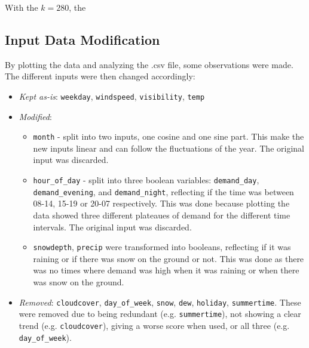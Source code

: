     With the $k = 280$, the

    







    \subsection{Input Data Modification}
    \label{sec:input data modification}
    By plotting the data and analyzing the .csv file, some observations were made. The different inputs were then changed accordingly:
    \begin{itemize}
        \item \emph{Kept as-is}: \texttt{weekday}, \texttt{windspeed}, \texttt{visibility}, \texttt{temp}
        \item \emph{Modified}:
        \begin{itemize}
            \item \texttt{month} - split into two inputs, one cosine and one sine part. This make the new inputs linear and can follow the fluctuations of the year. The original input was discarded.
            \item \texttt{hour\_of\_day} - split into three boolean variables: \texttt{demand\_day}, \texttt{demand\_evening}, and \texttt{demand\_night}, reflecting if the time was between 08-14, 15-19 or 20-07 respectively. This was done because plotting the data showed three different plateaues of demand for the different time intervals. The original input was discarded.
            \item \texttt{snowdepth}, \texttt{precip} were transformed into booleans, reflecting if it was raining or if there was snow on the ground or not. This was done as there was no times where demand was high when it was raining or when there was snow on the ground.
        \end{itemize} 
        \item \emph{Removed}: \texttt{cloudcover}, \texttt{day\_of\_week}, \texttt{snow}, \texttt{dew}, \texttt{holiday}, \texttt{summertime}. These were removed due to being redundant (e.g. \texttt{summertime}), not showing a clear trend (e.g. \texttt{cloudcover}), giving a worse score when used, or all three (e.g. \texttt{day\_of\_week}).
    \end{itemize}